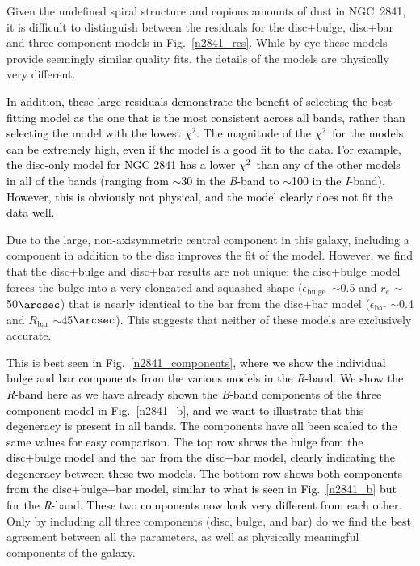 \documentclass[a4paper,fleqn,usenatbib]{mnras}
\newcommand{\authorfix}{\textcolor{black}}
\begin{document}
Given the undefined spiral structure and copious amounts of dust in NGC~2841, it is difficult to distinguish between the residuals for the disc+bulge, disc+bar and three-component models in Fig.~\ref{n2841_res}. While by-eye these models provide seemingly similar quality fits, the details of the models are physically very different. 

\authorfix{In addition, these large residuals demonstrate the benefit of selecting the best-fitting model as the one that is the most consistent across all bands, rather than selecting the model with the lowest $\chi^{2}$. The magnitude of the $\chi^{2}$\ for the models can be extremely high, even if the model is a good fit to the data. For example, the disc-only model for NGC 2841 has a lower $\chi^{2}$\ than any of the other models in all of the bands (ranging from $\sim$30 in the \textit{B}-band to $\sim$100 in the \textit{I}-band). However, this is obviously not physical, and the model clearly does not fit the data well.}

Due to the large, non-axisymmetric central component in this galaxy, including a component in addition to the disc improves the fit of the model. However, we find that the disc+bulge and disc+bar results are not unique: the disc+bulge model forces the bulge into a very elongated and squashed shape ($\epsilon_{\mathrm{bulge}}$\ $\sim$0.5 and $r_{e}$ $\sim$50$\arcsec$) that is nearly identical to the bar from the disc+bar model ($\epsilon_{\mathrm{bar}}$ $\sim$0.4 and $R_{\mathrm{bar}}$ $\sim$45$\arcsec$). This suggests that neither of these models are exclusively accurate. 

\authorfix{This is best seen in Fig.~\ref{n2841_components}, where we show the individual bulge and bar components from the various models in the \textit{R}-band. We show the \textit{R}-band here as we have already shown the \textit{B}-band components of the three component model in Fig.~\ref{n2841_b}, and we want to illustrate that this degeneracy is present in all bands. The components have all been scaled to the same values for easy comparison. The top row shows the bulge from the disc+bulge model and the bar from the disc+bar model, clearly indicating the degeneracy between these two models. The bottom row shows both components from the disc+bulge+bar model, similar to what is seen in Fig.~\ref{n2841_b} but for the \textit{R}-band. These two components now look very different from each other.} Only by including all three components (disc, bulge, and bar) do we find the best agreement between all the parameters, as well as physically meaningful components of the galaxy. 
\end{document}

